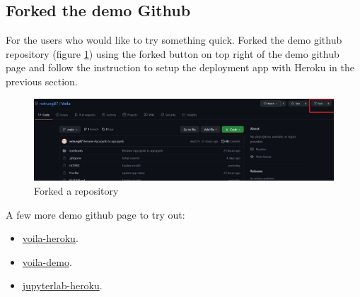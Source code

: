 \subsection{Forked the demo Github}

For the users who would like to try something quick. Forked the demo github repository (figure \ref{figure:Forked repo}) using the forked button on top right of the demo github page and follow the instruction to setup the deployment app with Heroku in the previous section.

\begin{figure}[H]
	\centering
    \includegraphics[width=0.8\columnwidth]{Pictures/forked repository.jpg}
	\caption[Short title]{Forked a repository}
	\label{figure:Forked repo}
\end{figure}

A few more demo github page to try out:
\begin{itemize}
    \item \hyperlink{https://github.com/voila-dashboards/voila-heroku}{voila-heroku}.
    \item \hyperlink{https://github.com/maartenbreddels/voila-demo}{voila-demo}.
    \item \hyperlink{https://github.com/jtpio/jupyterlab-heroku}{jupyterlab-heroku}.
\end{itemize}


\newpage

